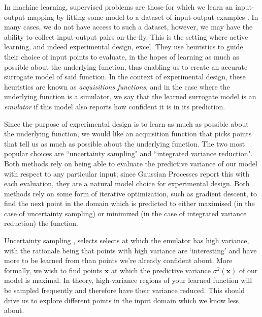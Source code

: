 In machine learning, supervised problems are those for which we learn an input-output mapping by fitting some model to a dataset of input-output examples \cite{SupervisedLearning2020}. In many cases, we do not have access to such a dataset, however, we may have the ability to collect input-output pairs on-the-fly. This is the setting where active learning, and indeed experimental design, excel. They use heuristics to guide their choice of input points to evaluate, in the hopes of learning as much as possible about the underlying function, thus enabling us to create an accurate surrogate model of said function. In the context of experimental design, these heuristics are known as \textit{acquisitions functions}, and in the case where the underlying function is a simulator, we say that the learned surrogate model is an \textit{emulator} if this model also reports how confident it is in its prediction.

Since the purpose of experimental design is to learn as much as possible about the underlying function, we would like an acquisition function that picks points that tell us as much as possible about the underlying function. The two most popular choices are ``uncertainty sampling" and ``integrated variance reduction". Both methods rely on being able to evaluate the predictive variance of our model with respect to any particular input; since Gaussian Processes report this with each evaluation, they are a natural model choice for experimental design. Both methods rely on some form of iterative optimization, such as gradient descent, to find the next point in the domain which is predicted to either maximised (in the case of uncertainty sampling) or minimized (in the case of integrated variance reduction) \cite{EmukitExperimentalDesign2020} the function.

Uncertainty sampling \cite{lewisHeterogeneousUncertaintySampling1994}, selects selects at which the emulator has high variance, with the rationale being that points with high variance are `interesting' and have more to be learned from than points we're already confident about. More formally, we wish to find points $\mathbf{x}$ at which the predictive variance $\sigma^{2}(\mathbf{x})$ of our model is maximal. In theory, high-variance regions of your learned function will be sampled frequently and therefore have their variance reduced. This should drive us to explore different points in the input domain which we know less about.


